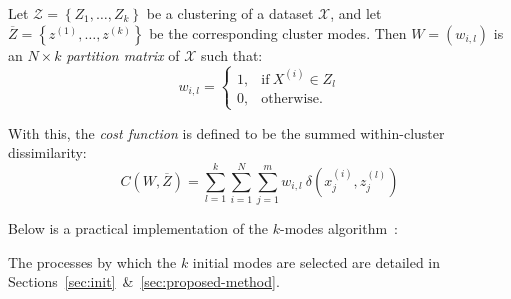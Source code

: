 \begin{definition}\label{def:cost}
    Let \(\mathcal{Z} = \left\{Z_1, \ldots, Z_k\right\}\) be a clustering of a
    dataset \(\mathcal{X}\), and let \(\overline Z = \left\{z^{(1)},
    \ldots, z^{(k)}\right\}\) be the corresponding cluster modes. Then \(W =
    (w_{i, l})\) is an \(N \times k\) \emph{partition matrix} of \(\mathcal{X}\)
    such that:
    \[
        w_{i, l} = \begin{cases}
                     1, & \text{if} \ X^{(i)} \in Z_l\\
                     0, & \text{otherwise.}
                   \end{cases}
    \]

    With this, the \emph{cost function} is defined to be the summed
    within-cluster dissimilarity:
    \begin{equation}
        C\left(W, \overline Z\right) = \sum_{l=1}^{k} \sum_{i=1}^{N}
        \sum_{j=1}^{m} w_{i,l} \ \delta\left(x_j^{(i)}, z_j^{(l)}\right)
    \end{equation}
\end{definition}

Below is a practical implementation of the \(k\)-modes
algorithm~\cite{Huang1998}:



\begin{remark}
    The processes by which the \(k\) initial modes are selected are detailed in 
    Sections~\ref{sec:init}~\&~\ref{sec:proposed-method}.
\end{remark}
